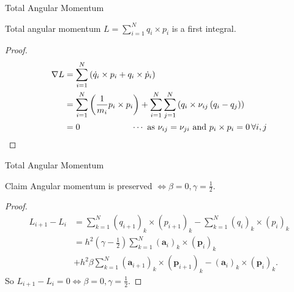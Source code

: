 \documentclass{beamer}
\renewcommand{\vec}[1]{\mathbf{#1}}
\begin{document}
\begin{frame}{Total Angular Momentum}
\begin{theorem} Total angular momentum $L = \sum_{i=1}^{N} q_{i} \times p_{i}$ is a first integral. \end{theorem}
\begin{proof}
	\begin{align*}
		\nabla L & = \sum_{i=1}^{N} \left(\dot{q}_{i} \times p_{i} + {q}_{i} \times \dot{p}_{i}\right) \\  
		& = \sum_{i=1}^{N} \left( \frac{1}{m_{i}}p_{i} \times p_{i}\right) +  \sum_{i=1}^{N}\sum_{j=1}^{N} \left(q_{i} \times \nu_{ij}\left(q_{i} - q_{j}\right)\right) \\
		& = 0  \qquad \qquad \qquad \cdots \mbox{ as }\nu_{ij} = \nu_{ji} \mbox{ and } p_{i} \times p_{i} = 0 \,\forall i, j \qedhere
	\end{align*}
\end{proof}
\end{frame}

\begin{frame}{Total Angular Momentum}
\begin{block}{Claim} Angular momentum is preserved $\Leftrightarrow \beta = 0, \gamma = \frac{1}{2}$. \end{block}
\begin{proof}
	\begin{align*}
		L_{i+1} -  L_{i} &= \sum_{k=1}^{N}\left(q_{i+1}\right)_{k} \times \left(p_{i+1}\right)_{k} - \sum_{k=1}^{N}\left(q_{i}\right)_{k} \times \left(p_{i}\right)_{k} \\
		&= h^{2}\left(\gamma - \frac{1}{2}\right)\sum_{k=1}^{N} (\vec{a}_{i})_{k} \times (\vec{p}_{i})_{k} \\ &+ h^{2}\beta\sum_{k=1}^{N} (\vec{a}_{i+1})_{k} \times (\vec{p}_{i+1})_{k} - (\vec{a}_{i})_{k} \times (\vec{p}_{i})_{k} .
	\end{align*}
	\vspace{-4pt}
	So $L_{i+1}-L_{i} = 0 \Leftrightarrow \beta = 0, \gamma = \frac{1}{2}$.
\end{proof}
\end{frame}
\end{document}
